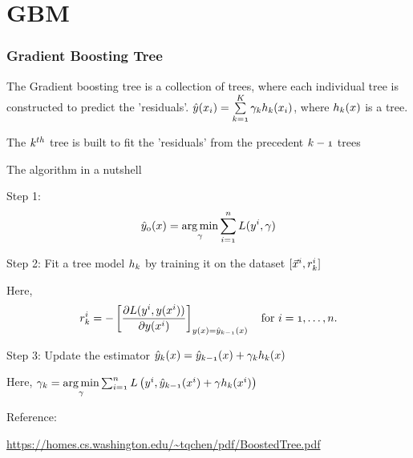 \documentclass[notheorems, aspectratio=54]{beamer}
\begin{document}
\section{GBM}

\begin{frame}

\frametitle{Gradient Boosting Tree}
The Gradient boosting tree is a collection of trees, where each individual tree is constructed to predict the 'residuals'.
$\mathnormal{\hat{y}(x_i)=\sum\limits_{k=1}^K \gamma_k h_k(x_i)}$, where $\mathnormal{h_k(x)}$ is a tree. 

The $\mathnormal{k^{th}}$ tree is built to fit the 'residuals' from the precedent $\mathnormal{k-1}$ trees  

\end{frame}

\begin{frame}
The algorithm in a nutshell

Step 1: 
$$\mathnormal{\hat{y}_0(x) = \underset{\gamma}{\arg\min} \sum_{i=1}^n L(y^i, \gamma)}$$

Step 2: Fit a tree model $\mathnormal{h_{k}}$ by training it on the dataset $\mathnormal{[\vec{x}^i, r^{i}_{k}]}$

Here,
$$\mathnormal{r^{i}_{k} = -\left[\frac{\partial L(y^i, {y}(x^i))}{\partial y(x^i)}\right]_{{y}(x)=\hat{y}_{k-1}(x)} \quad \mbox{for } i=1,\ldots,n.}$$

Step 3: Update the estimator $\mathnormal{\hat{y}_{k}(x)=\hat{y}_{{k-1}}(x)+\gamma _{k}h_{k}(x)}$ 

Here, 
$\mathnormal{\gamma_k = \underset{\gamma}{\operatorname{arg\,min}} \sum_{i=1}^n L\left(y^i, \hat{y}_{k-1}(x^i) + \gamma h_k(x^i)\right)}$

Reference: 

\url{https://homes.cs.washington.edu/~tqchen/pdf/BoostedTree.pdf}
\end{frame}
\end{document}

